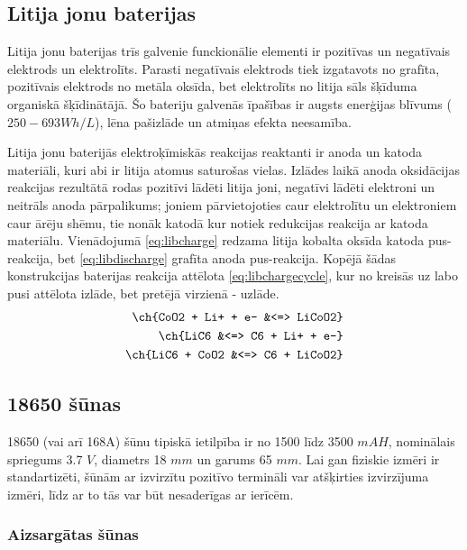\documentclass[12pt,fleqn,titlepage,oneside]{article}
\numberwithin{equation}{section}
\numberwithin{figure}{section}
\numberwithin{table}{section}
\begin{document}
\subsection{Litija jonu baterijas}

Litija jonu baterijas trīs galvenie funckionālie elementi ir pozitīvas un negatīvais elektrods un elektrolīts. 
Parasti negatīvais elektrods tiek izgatavots no grafīta, pozitīvais elektrods no metāla oksīda, bet elektrolīts no litija sāls šķīduma organiskā šķīdinātājā.
Šo bateriju galvenās īpašības ir augsts enerģijas blīvums ($250-693Wh/L$), lēna pašizlāde un atmiņas efekta neesamība.

Litija jonu baterijās elektroķīmiskās reakcijas reaktanti ir anoda un katoda materiāli, kuri abi ir litija atomus saturošas vielas.
Izlādes laikā anoda oksidācijas reakcijas rezultātā rodas pozitīvi lādēti litija joni, negatīvi lādēti elektroni un neitrāls anoda pārpalikums;
joniem pārvietojoties caur elektrolītu un elektroniem caur ārēju shēmu, tie nonāk katodā kur notiek redukcijas reakcija ar katoda materiālu.
Vienādojumā \ref{eq:libcharge} redzama litija kobalta oksīda katoda pus-reakcija, bet \ref{eq:libdischarge} grafīta anoda pus-reakcija.
Kopējā šādas konstrukcijas baterijas reakcija attēlota \ref{eq:libchargecycle}, kur no kreisās uz labo pusi attēlota izlāde, bet pretējā virzienā - uzlāde.
\begin{align}
	\ch{CoO2 + Li+ + e- &<=> LiCoO2}		\label{eq:libcharge} \\
	\ch{LiC6 &<=> C6 + Li+ + e-}			\label{eq:libdischarge} \\
	\ch{LiC6 + CoO2 &<=> C6 + LiCoO2}	\label{eq:libchargecycle}
\end{align}



\subsection{18650 šūnas}

18650 (vai arī 168A) šūnu tipiskā ietilpība ir no 1500 līdz 3500 $mAH$, nominālais spriegums 3.7 $V$,
diametrs 18 $mm$ un garums 65 $mm$.\cite{18650cell}
Lai gan fiziskie izmēri ir standartizēti, šūnām ar izvirzītu pozitīvo termināli var atšķirties izvirzījuma izmēri,
līdz ar to tās var būt nesaderīgas ar ierīcēm.

\subsubsection{Aizsargātas šūnas}
\end{document}
